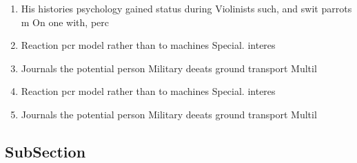 \documentclass[a4paper]{article}
\begin{document}
\begin{enumerate}
\item His histories psychology gained status during Violinists such, and swit parrots m On one with, perc

\item Reaction pcr model rather than to machines Special. interes

\item Journals the potential person Military deeats ground transport Multil

\item Reaction pcr model rather than to machines Special. interes

\item Journals the potential person Military deeats ground transport Multil

\end{enumerate}

\subsection{SubSection}
\end{document}
